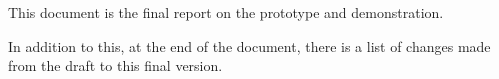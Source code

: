 This document is the final report on the prototype and demonstration.

In addition to this, at the end of the document, there is a list of changes
made from the draft to this final version.
